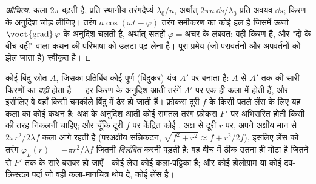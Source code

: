 \begin{proof}[औचित्य]
कला $2\pi$ बढ़ती है, प्रति स्थानीय तरंगदैर्घ्य $\lambda_0/n$, अर्थात्
$2\pi n\,\dd s/\lambda_0$ प्रति अवयव $\dd s$; किरण के अनुदिश जोड़ लीजिए। तरंग
$a\cos(\omega t - \varphi)$ तरंग समीकरण का कोई हल है जिसमें
ऊर्जा $\operatorname{\vect{grad}}\varphi$ के अनुदिश चलती है, अर्थात् सतहों
$\varphi = \text{अचर}$ के लंबवत: वही किरण है, और "दो  के बीच  वही" वाला कथन  की परिभाषा को उलटा पढ़ लेना है।
पूरा प्रमेय (जो परावर्तनों और अपवर्तनों को झेल जाता है) स्वीकृत है।
\end{proof}

\begin{example}[बिंदुकता; लेंस कोई कला-पट्टिका]\label{ex:b2:scalar-light-model:lens}
कोई बिंदु स्रोत $A$, जिसका प्रतिबिंब कोई पूर्ण (बिंदुकर) यंत्र $A'$ पर बनाता है:
$A$ से $A'$ तक की सारी किरणों का \emph{ वही} होता है --- हर
किरण के अनुदिश आती तरंगें $A'$ पर एक ही कला में होती हैं, और इसीलिए वे
वहाँ किसी चमकीले बिंदु में ढेर हो जाती हैं। फ़ोकस दूरी $f$ के किसी पतले लेंस के लिए
यह कला का कोई कथन है: अक्ष के अनुदिश आती कोई समतल तरंग
फ़ोकस $F'$ पर अभिसरित होती किसी  की तरह निकलनी चाहिए; और चूँकि
दूरी $f$ पर केंद्रित कोई , अक्ष से दूरी $r$ पर,
अपने अक्षीय मान से $2\pi r^2/2\lambda f$ कला आगे रहती है (परअक्षीय
सन्निकटन, $\sqrt{f^2 + r^2} \approx f + r^2/2f$), इसलिए लेंस को तरंग
$\varphi_L(r) = -\pi r^2/\lambda f$ जितनी \emph{विलंबित} करनी पड़ती है: वह बीच में
ठीक उतना ही मोटा है जितने से $F'$ तक के सारे 
बराबर हो जाएँ। कोई लेंस कोई कला-पट्टिका है; और कोई होलोग्राम या कोई द्रव-क्रिस्टल पर्दा
जो वही कला-मानचित्र थोप दे, कोई लेंस है।
\end{example}

